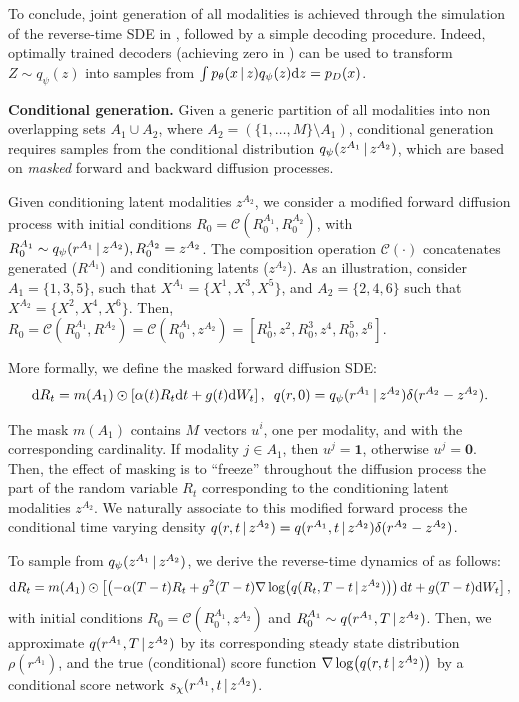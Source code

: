 To conclude, joint generation of all modalities is achieved through the simulation of the reverse-time \gls{SDE} in , followed by a simple decoding procedure. Indeed, optimally trained decoders (achieving zero in ) can be used to transform $Z\sim q_\psi(z)$ into samples from $\int p_\theta(x\,|\, z)q_\psi(z)\dd z=p_D(x)$.

\noindent \textbf{Conditional generation.} Given a generic partition of all modalities into non overlapping sets $A_1 \cup A_2$, where $A_2=\left(  {\{1,\dots,M\}\setminus A_1}  \right)$, conditional generation requires samples from the conditional distribution $q_\psi(z^{A_1}\,|\, z^{A_2})$, which are based on \textit{masked} forward and backward diffusion processes. 

Given conditioning latent modalities $z^{A_2}$, we consider a modified forward diffusion process with initial conditions $R_0=\mathcal{C}(R^{A_1}_0,R^{A_2}_0)$, with $R^{A_1}_0\sim q_\psi(r^{A_1}\,|\, z^{A_2}),R^{A_2}_0=z^{A_2}$. The composition operation $\mathcal{C}(\cdot)$ concatenates generated ($R^{A_1}$) and conditioning latents ($z^{A_2}$). As an illustration, consider $A_1 = \{1,3,5\}$, such that $X^{A_1} = \{X^1, X^3, X^5 \}$, and $A_2 = \{2,4,6\}$ such that $X^{A_2} = \{X^2, X^4, X^6 \}$. Then, $R_0=\mathcal{C}(R^{A_1}_0,R^{A_2})=\mathcal{C}(R^{A_1}_0,z^{A_2})=[ R^1_0,z^2,R^3_0,z^4,R^5_0,z^6]$.

More formally, we define the masked forward diffusion \gls{SDE}:
\begin{equation}\label{eq:cond_fw_sde_c}
    \dd R_t=m(A_1)\odot\left[ \alpha(t)R_t\dd t+g(t)\dd W_t\right],\,\,\, q(r,0)= q_\psi(r^{A_1}\,|\, z^{A_2})\delta(r^{A_2}-z^{A_2}).
\end{equation}


The mask $m(A_1)$ contains $M$ vectors $u^i$, one per modality, and with the corresponding cardinality. If modality $j \in A_1$, then $u^j = \mathbf{1}$, otherwise $u^j = \mathbf{0}$. Then, the effect of masking is to ``freeze'' throughout the diffusion process the part of the random variable $R_t$ corresponding to the conditioning latent modalities $z^{A_2}$. We naturally associate to this modified forward process the conditional time varying density $q(r,t\,|\, z^{A_2})=q(r^{A_1},t\,|\, z^{A_2})\delta(r^{A_2}-z^{A_2})$.

To sample from $q_\psi(z^{A_1}\,|\, z^{A_2})$, we derive the reverse-time dynamics of  as follows:
\begin{equation}\label{eq:cond_bw_sde_c}
  \dd R_t=m(A_1)\odot\left[\left(-\alpha(T-t)R_t+g^2(T-t)\nabla\log(q(R_t,T-t\,|\, z^{A_2}))\right)\dd t+g(T-t)\dd W_t\right], 
\end{equation}
with initial conditions $R_0=\mathcal{C}(R^{A_1}_0,z^{A_2})$ and $R^{A_1}_0\sim q(r^{A_1},T\,|\, z^{A_2})$. Then, we approximate $q(r^{A_1},T\,|\, z^{A_2})$ by its corresponding steady state distribution $\rho(r^{A_1})$, and the true (conditional) score function $\nabla\log(q(r,t\,|\, z^{A_2}))$ by a conditional score network $s_\chi(r^{A_1},t\,|\, z^{A_2})$. 









